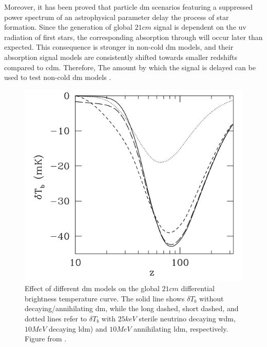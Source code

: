 \documentclass[12pt, TexShade, letterpaper]{report}
\begin{document}
Moreover, it has been proved that particle \gls{dm} scenarios featuring a suppressed power spectrum of an astrophysical parameter delay the process of star formation. Since the generation of global $21cm$ signal is dependent on the \gls{uv} radiation of first stars, the corresponding absorption through will occur later than expected. This consequence is stronger in non-cold \gls{dm} models, and their absorption signal models are consistently shifted towards smaller redshifts compared to \gls{cdm}. Therefore, The amount by which the signal is delayed can be used to test non-cold \gls{dm} models  \cite{noncold_dm_21, first_star_impact, dm_timing}.\par 

\begin{figure}[h!]
    \centering
    \includegraphics{21cm_dm.jpg}
    \caption[Effect of different \gls{dm} models on the global $21cm$ differential brightness temperature curve]{Effect of different \gls{dm} models on the global $21cm$ differential brightness temperature curve. The solid line shows $\delta T_b$ without decaying/annihilating \gls{dm}, while the long dashed, short dashed, and dotted lines refer to $\delta T_b$ with $25keV$ sterile neutrino decaying \gls{wdm}, $10 MeV$ decaying \gls{ldm}) and $10MeV$ annihilating \gls{ldm}, respectively. Figure from \cite{constrain_dm_21}.}
    \label{fig:enter-label}
\end{figure}
\end{document}
